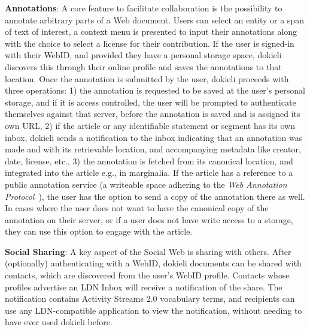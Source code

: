 \documentclass[a4paper]{llncs}
\begin{document}
                                    
\par \textbf{Annotations}: A core feature to facilitate collaboration is the possibility to annotate arbitrary parts of a Web document.
                                    Users can select an entity or a span of text of interest, a context menu is presented to input their annotations along with the choice to select a license for their contribution.
                                    If the user is signed-in with their WebID, and provided they have a personal storage space, dokieli discovers this through their online profile and saves the annotations to that location.
                                    Once the annotation is submitted by the user, dokieli proceeds with three operations: 1) the annotation is requested to be saved at the user’s personal storage, and if it is access controlled, the user will be prompted to authenticate themselves against that server, before the annotation is saved and is assigned its own URL, 2) if the article or any identifiable statement or segment has its own inbox, dokieli sends a notification to the inbox indicating that an annotation was made and with its retrievable location, and accompanying metadata like creator, date, license, etc., 3) the annotation is fetched from its canonical location, and integrated into the article e.g., in marginalia. If the article has a reference to a public annotation service (a writeable space adhering to the \textit{Web Annotation Protocol}~\cite{ref-15}), the user has the option to send a copy of the annotation there as well. In cases where the user does not want to have the canonical copy of the annotation on their server, or if a user does not have write access to a storage, they can use this option to engage with the article.
                                    

                                    
\par \textbf{Social Sharing}: A key aspect of the Social Web is sharing with others.
                                    After (optionally) authenticating with a WebID, dokieli documents can be shared with contacts, which are discovered from the user’s WebID profile. Contacts whose profiles advertise an LDN Inbox will receive a notification of the share. The notification contains Activity Streams 2.0 vocabulary terms, and recipients can use any LDN-compatible application to view the notification, without needing to have ever used dokieli before.
\end{document}
